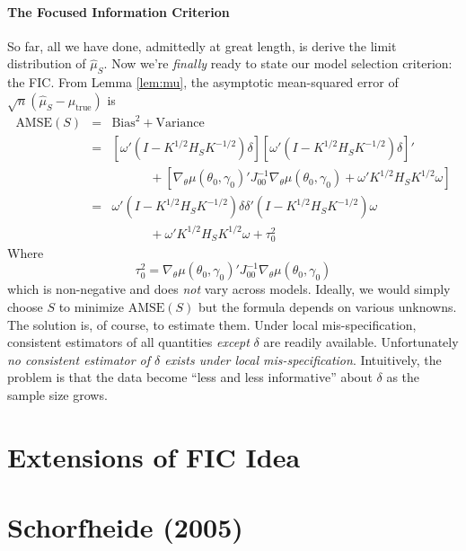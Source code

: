 \documentclass[12pt]{article}
\theoremstyle{definition}
\begin{document}
\paragraph{The Focused Information Criterion} So far, all we have done, admittedly at great length, is derive the limit distribution of $\widehat{\mu}_S$. Now we're \emph{finally} ready to state our model selection criterion: the FIC. From Lemma \ref{lem:mu}, the asymptotic mean-squared error of $\sqrt{n}\left(\widehat{\mu}_S - \mu_{\mbox{true}} \right)$ is
	\begin{eqnarray*}
		\mbox{AMSE}(S) &=& \mbox{Bias}^2 + \mbox{Variance}\\
		&=&\left[\omega'(I - K^{1/2}H_SK^{-1/2})\delta \right] \left[\omega'(I - K^{1/2}H_SK^{-1/2})\delta \right]'\\
			&& \quad \quad \quad + \left[\nabla_\theta \mu(\theta_0, \gamma_0)'J_{00}^{-1}\nabla_\theta \mu(\theta_0, \gamma_0) + \omega'K^{1/2}H_S K^{1/2}\omega \right]\\
		&=& \omega' (I - K^{1/2}H_SK^{-1/2})\delta \delta'(I - K^{1/2}H_SK^{-1/2})\omega \\
		&& \quad \quad \quad + \omega'K^{1/2}H_S K^{1/2}\omega  + \tau_0^2
	\end{eqnarray*}
Where 
	$$\tau_0^2 = \nabla_\theta \mu(\theta_0, \gamma_0)'J_{00}^{-1}\nabla_\theta \mu(\theta_0, \gamma_0)$$
which is non-negative and does \emph{not} vary across models. Ideally, we would simply choose $S$ to minimize $\mbox{AMSE}(S)$ but the formula depends on various unknowns. The solution is, of course, to estimate them. Under local mis-specification, consistent estimators of all quantities \emph{except} $\delta$ are readily available. Unfortunately \emph{no consistent estimator of $\delta$ exists under local mis-specification}. Intuitively, the problem is that the data become ``less and less informative'' about $\delta$ as the sample size grows.


\section{Extensions of FIC Idea}

\section{Schorfheide (2005)}
\end{document}
